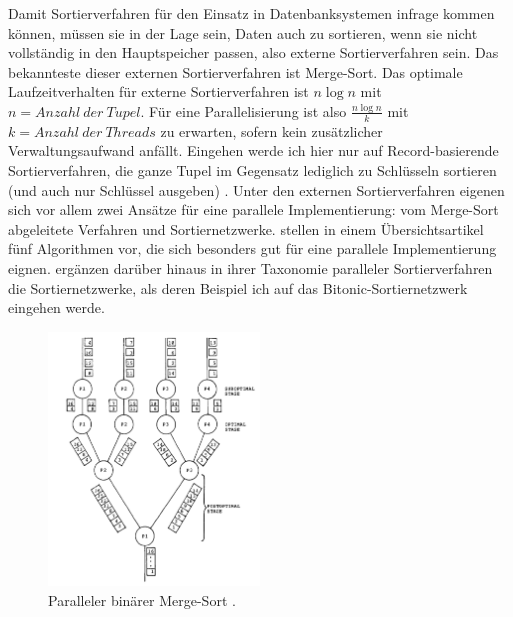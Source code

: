 \documentclass[a4paper,12pt,twoside]{article}
\begin{document}
Damit Sortierverfahren für den Einsatz in Datenbanksystemen infrage kommen können, müssen sie in der Lage sein, Daten auch zu sortieren, wenn sie nicht vollständig in den Hauptspeicher passen, also externe Sortierverfahren sein. Das bekannteste dieser externen Sortierverfahren ist Merge-Sort. Das optimale Laufzeitverhalten für externe Sortierverfahren ist $ n \log n $ mit $n = Anzahl~der~Tupel$. Für eine Parallelisierung ist also $ \frac{n \log n} {k} $ mit $k = Anzahl~der~Threads$ zu erwarten, sofern kein zusätzlicher Verwaltungsaufwand anfällt. Eingehen werde ich hier nur auf Record-basierende Sortierverfahren, die ganze Tupel im Gegensatz lediglich zu Schlüsseln sortieren (und auch nur Schlüssel ausgeben) \parencite{Salzberg1990}. Unter den externen Sortierverfahren eigenen sich vor allem zwei Ansätze für eine parallele Implementierung: vom Merge-Sort abgeleitete Verfahren und Sortiernetzwerke. {\textcite[S. 831ff]{Taniar2000}} stellen in einem Übersichtsartikel fünf Algorithmen vor, die sich besonders gut für eine parallele Implementierung eignen. {\textcite[S. 9ff] {Bitton1984}} ergänzen darüber hinaus in ihrer Taxonomie paralleler Sortierverfahren die Sortiernetzwerke, als deren Beispiel ich auf das Bitonic-Sortiernetzwerk eingehen werde.

\begin{figure}
	\centering
	\includegraphics[width=0.5\textwidth]{Bilder/b-merge-sort.png}
	\caption{Paralleler binärer Merge-Sort \parencite[S. 334]{Bitton1983}.}
	\label{img:bMergeSort}
\end{figure}
\end{document}
